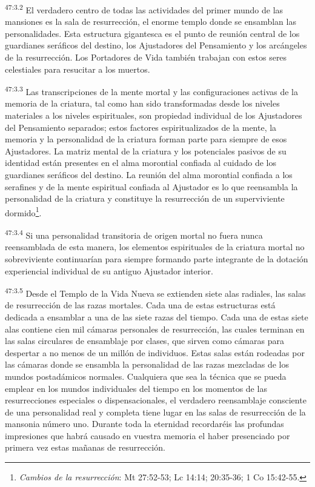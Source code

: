 \par
\textsuperscript{47:3.2} El verdadero centro de todas las actividades del primer mundo de las mansiones es la sala de resurrección, el enorme templo donde se ensamblan las personalidades. Esta estructura gigantesca es el punto de reunión central de los guardianes seráficos del destino, los Ajustadores del Pensamiento y los arcángeles de la resurrección. Los Portadores de Vida también trabajan con estos seres celestiales para resucitar a los muertos.

\par
\textsuperscript{47:3.3} Las transcripciones de la mente mortal y las configuraciones activas de la memoria de la criatura, tal como han sido transformadas desde los niveles materiales a los niveles espirituales, son propiedad individual de los Ajustadores del Pensamiento separados; estos factores espiritualizados de la mente, la memoria y la personalidad de la criatura forman parte para siempre de esos Ajustadores. La matriz mental de la criatura y los potenciales pasivos de su identidad están presentes en el alma morontial confiada al cuidado de los guardianes seráficos del destino. La reunión del alma morontial confiada a los serafines y de la mente espiritual confiada al Ajustador es lo que reensambla la personalidad de la criatura y constituye la resurrección de un superviviente dormido\footnote{\textit{Cambios de la resurrección}: Mt 27:52-53; Lc 14:14; 20:35-36; 1 Co 15:42-55.}.

\par
\textsuperscript{47:3.4} Si una personalidad transitoria de origen mortal no fuera nunca reensamblada de esta manera, los elementos espirituales de la criatura mortal no sobreviviente continuarían para siempre formando parte integrante de la dotación experiencial individual de su antiguo Ajustador interior.

\par
\textsuperscript{47:3.5} Desde el Templo de la Vida Nueva se extienden siete alas radiales, las salas de resurrección de las razas mortales. Cada una de estas estructuras está dedicada a ensamblar a una de las siete razas del tiempo. Cada una de estas siete alas contiene cien mil cámaras personales de resurrección, las cuales terminan en las salas circulares de ensamblaje por clases, que sirven como cámaras para despertar a no menos de un millón de individuos. Estas salas están rodeadas por las cámaras donde se ensambla la personalidad de las razas mezcladas de los mundos postadámicos normales. Cualquiera que sea la técnica que se pueda emplear en los mundos individuales del tiempo en los momentos de las resurrecciones especiales o dispensacionales, el verdadero reensamblaje consciente de una personalidad real y completa tiene lugar en las salas de resurrección de la mansonia número uno. Durante toda la eternidad recordaréis las profundas impresiones que habrá causado en vuestra memoria el haber presenciado por primera vez estas mañanas de resurrección.

